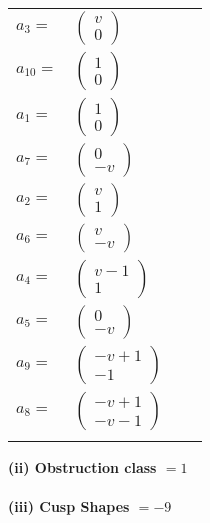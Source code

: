 \documentclass[1p]{elsarticle_modified}
\theoremstyle{definition}
\begin{document}
\begin{tabular}{m{7pt} m{180pt} m{7pt} m{180pt} }
\flushright $a_{3}=$&$\begin{pmatrix}v\\0\end{pmatrix}$ \\
\flushright $a_{10}=$&$\begin{pmatrix}1\\0\end{pmatrix}$ \\
\flushright $a_{1}=$&$\begin{pmatrix}1\\0\end{pmatrix}$ \\
\flushright $a_{7}=$&$\begin{pmatrix}0\\- v\end{pmatrix}$ \\
\flushright $a_{2}=$&$\begin{pmatrix}v\\1\end{pmatrix}$ \\
\flushright $a_{6}=$&$\begin{pmatrix}v\\- v\end{pmatrix}$ \\
\flushright $a_{4}=$&$\begin{pmatrix}v-1\\1\end{pmatrix}$ \\
\flushright $a_{5}=$&$\begin{pmatrix}0\\- v\end{pmatrix}$ \\
\flushright $a_{9}=$&$\begin{pmatrix}- v+1\\-1\end{pmatrix}$ \\
\flushright $a_{8}=$&$\begin{pmatrix}- v+1\\- v-1\end{pmatrix}$\\&\end{tabular}
\flushleft \textbf{(ii) Obstruction class $= 1$}\\~\\
\flushleft \textbf{(iii) Cusp Shapes $= -9$}\\~\\
\end{document}
